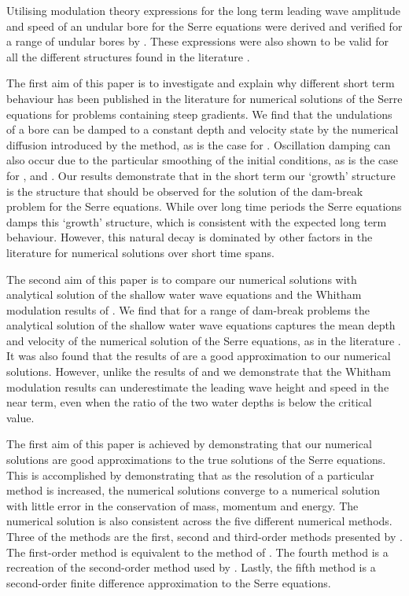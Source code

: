 \documentclass[times]{elsarticle}
\begin{document}
Utilising modulation theory expressions for the long term leading wave amplitude and speed of an undular bore for the Serre equations were derived and verified for a range of undular bores by \citet{El-etal-2006}. These expressions were also shown to be valid for all the different structures found in the literature \cite{El-etal-2006,Mitsotakis-etal-2014}.


The first aim of this paper is to investigate and explain why different short term behaviour has been published in the literature for numerical solutions of the Serre equations for problems containing steep gradients. We find that the undulations of a bore can be damped to a constant depth and velocity state by the numerical diffusion introduced by the method, as is the case for \citet{Hank-etal-2010-2034}. Oscillation damping can also occur due to the particular smoothing of the initial conditions, as is the case for \citet{Mitsotakis-etal-2017}, \citet{El-etal-2006} and \citet{Mitsotakis-etal-2014}. Our results demonstrate that in the short term our `growth' structure is the structure that should be observed for the solution of the dam-break problem for the Serre equations. While over long time periods the Serre equations damps this `growth' structure, which is consistent with the expected long term behaviour. However, this natural decay is dominated by other factors in the literature for numerical solutions over short time spans.

The second aim of this paper is to compare our numerical solutions with analytical solution of the shallow water wave equations and the Whitham modulation results of \citet{El-etal-2006}. We find that for a range of dam-break problems the analytical solution of the shallow water wave equations captures the mean depth and velocity of the numerical solution of the Serre equations, as in the literature \cite{Hank-etal-2010-2034,Mitsotakis-etal-2014,El-Hoefer-2016-11}. It was also found that the results of \citet{El-etal-2006} are a good approximation to our numerical solutions. However, unlike the results of \citet{El-etal-2006} and \citet{Mitsotakis-etal-2014} we demonstrate that the Whitham modulation results can underestimate the leading wave height and speed in the near term, even when the ratio of the two water depths is below the critical value.

The first aim of this paper is achieved by demonstrating that our numerical solutions are good approximations to the true solutions of the Serre equations. This is accomplished by demonstrating that as the resolution of a particular method is increased, the numerical solutions converge to a numerical solution with little error in the conservation of mass, momentum and energy. The numerical solution is also consistent across the five different numerical methods. Three of the methods are the first, second and third-order methods presented by \citet{Zoppou-etal-2017}. The first-order method is equivalent to the method of \citet{Hank-etal-2010-2034}. The fourth method is a recreation of the second-order method used by \citet{El-etal-2006}. Lastly, the fifth method is a second-order finite difference approximation to the Serre equations. 
\end{document}
